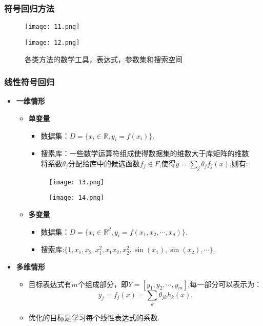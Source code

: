 \documentclass[CJK,aspectratio=169]{beamer}  %
\begin{document}
	\begin{frame}
		\frametitle{符号回归方法}
		\begin{figure}
			\centering 
			\texttt{[image: 11.png]}
		\end{figure}
	\end{frame}
	\begin{frame}
		\begin{figure}
			\centering 
			\texttt{[image: 12.png]}
			\captionsetup{font=tiny}
			\caption{各类方法的数学工具，表达式，参数集和搜索空间}
		\end{figure}
	\end{frame}
	\begin{frame}
		\frametitle{线性符号回归}
		\begin{itemize}
			\item \textbf{一维情形}
			\begin{itemize}
				\item \textbf{单变量}
				\begin{itemize}
					\item 数据集：$D=\{x_i\in \mathbb{R},y_i=f(x_i)\}.$
					\item 搜素库：一些数学运算符组成使得数据集的维数大于库矩阵的维数
					\\
					将系数$\theta_j$分配给库中的候选函数$f_j\in F$,使得$y=\sum_{j}\theta_jf_j(x)$,则有:
				\end{itemize}
				\begin{figure}
					\begin{minipage}[b]{0.43\textwidth}
						\centering
						\texttt{[image: 13.png]}
					\end{minipage}
					\begin{minipage}[t]{0.43\textwidth}
						\centering
						\texttt{[image: 14.png]}
					\end{minipage}
				\end{figure}
				\item \textbf{多变量}
				\begin{itemize}
					\item 数据集：$D=\{x_i\in \mathbb{R}^d,y_i=f(x_1,x_2,\cdots,x_d)\}.$
					\item 搜索库:$\{1,x_1,x_2,x_1^2,x_1x_2,x_2^2,\sin(x_1),\sin(x_2),\cdots\}.$
				\end{itemize}
			\end{itemize}
		\end{itemize}
	\end{frame}
	\begin{frame}
		\begin{itemize}
			\item \textbf{多维情形}
			\begin{itemize}
				\item 目标表达式有$m$个组成部分，即$Y=[ y_1,y_2,\cdots,y_m]$,每一部分可以表示为：
				$$y_j=f_j(x)=\sum_{k}\theta_{jk}h_k(x).$$
				\item 优化的目标是学习每个线性表达式的系数.
			\end{itemize}
		\end{itemize}
	\end{frame}
\end{document}
